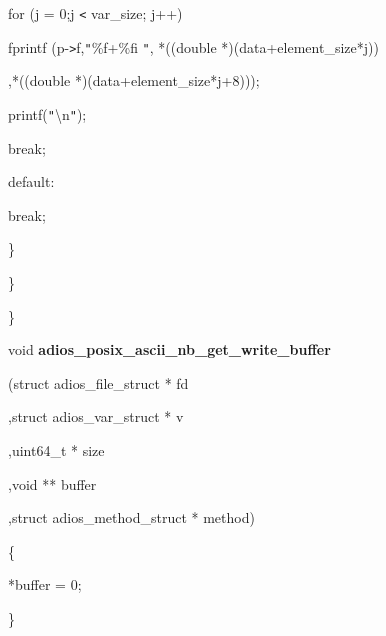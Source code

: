 \vspace{10pt}
\parindent=57pt
for (j = 0;j \texttt{<} var\_size; j++)

\vspace{10pt}
\parindent=72pt
fprintf (p-\texttt{>}f,\texttt{"}\%f+\%fi \texttt{"}, *((double *)(data+element\_size*j))

\vspace{10pt}
\parindent=100pt
,*((double *)(data+element\_size*j+8)));

\vspace{10pt}
\parindent=57pt
printf(\texttt{"}\textbackslash{}n\texttt{"});

\vspace{10pt}
break;

\vspace{10pt}
\parindent=100pt
default:

\vspace{10pt}
\parindent=57pt
break;

\vspace{10pt}
\parindent=28pt
\} 

\vspace{10pt}
\parindent=14pt
\}

\vspace{10pt}
\parindent=0pt
\}

\vspace{23pt}
\parindent=100pt
void {\color{color02} \textbf{adios\_posix\_ascii\_nb\_get\_write\_buffer }}

\vspace{10pt}
\parindent=190pt
{\color{color02} (struct adios\_file\_struct * fd}

\vspace{10pt}
\parindent=194pt
{\color{color02} ,struct adios\_var\_struct * v}

\vspace{10pt}
{\color{color02} ,uint64\_t * size}

\vspace{10pt}
\parindent=388pt
{\color{color02} ,void ** buffer}

\vspace{10pt}
\parindent=194pt
{\color{color02} ,struct adios\_method\_struct * method) }

\vspace{10pt}
\parindent=0pt
\{

\vspace{10pt}
\parindent=14pt
*buffer = 0;

\vspace{10pt}
\parindent=0pt
\}


